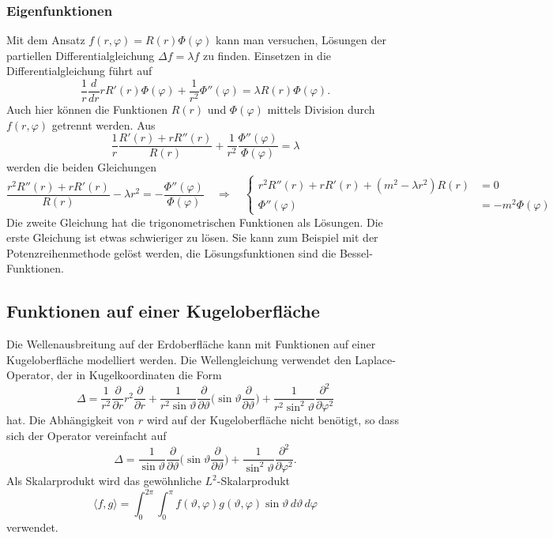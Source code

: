 \subsubsection{Eigenfunktionen}
Mit dem Ansatz $f(r,\varphi) = R(r) \Phi(\varphi)$ kann man versuchen,
Lösungen der partiellen Differentialgleichung $\Delta f=\lambda f$
zu finden.
Einsetzen in die Differentialgleichung führt auf
\[
\frac1r \frac{d}{dr} rR'(r) \Phi(\varphi)
+
\frac1{r^2} \Phi''(\varphi)
=
\lambda R(r)\Phi(\varphi).
\]
Auch hier können die Funktionen $R(r)$ und $\Phi(\varphi)$ mittels
Division durch $f(r,\varphi)$ getrennt werden.
Aus
\[
\frac1r \frac{R'(r) + rR''(r)}{R(r)}
+
\frac{1}{r^2}\frac{\Phi''(\varphi)}{\Phi(\varphi)}
=
\lambda
\]
werden die beiden Gleichungen
\[
\frac{r^2R''(r) + rR'(r)}{R(r)}
-
\lambda r^2
=
-\frac{\Phi''(\varphi)}{\Phi(\varphi)}
\quad\Rightarrow\quad
\left\{
\begin{aligned}
r^2R''(r) + rR'(r) +(m^2 - \lambda r^2)R(r) &= 0
\\
\Phi''(\varphi)&=-m^2 \Phi(\varphi)
\end{aligned}
\right.
\]
Die zweite Gleichung hat die trigonometrischen Funktionen
als Lösungen.
Die erste Gleichung ist etwas schwieriger zu lösen.
Sie kann zum Beispiel mit der Potenzreihenmethode gelöst werden, die
Lösungsfunktionen sind die Bessel-Funktionen.

%
%
\subsection{Funktionen auf einer Kugeloberfläche}
Die Wellenausbreitung auf der Erdoberfläche kann mit Funktionen
auf einer Kugeloberfläche modelliert werden.
Die Wellengleichung verwendet den Laplace-Operator, der in Kugelkoordinaten
die Form
\[
\Delta
=
\frac{1}{r^2}
\frac{\partial}{\partial r}
r^2
\frac{\partial}{\partial r}
+
\frac{1}{r^2\sin\vartheta}
\frac{\partial}{\partial\vartheta}
\biggl(\sin\vartheta\frac{\partial}{\partial\vartheta}\biggr)
+
\frac{1}{r^2\sin^2\vartheta}
\frac{\partial^2}{\partial\varphi^2}
\]
hat.
Die Abhängigkeit von $r$ wird auf der Kugeloberfläche nicht benötigt,
so dass sich der Operator vereinfacht auf
\[
\Delta
=
\frac{1}{\sin\vartheta}
\frac{\partial}{\partial\vartheta}
\biggl(\sin\vartheta\frac{\partial}{\partial\vartheta}\biggr)
+
\frac{1}{\sin^2\vartheta}
\frac{\partial^2}{\partial\varphi^2}.
\]
Als Skalarprodukt wird das gewöhnliche $L^2$-Skalarprodukt
\[
\langle f,g\rangle
=
\int_{0}^{2\pi}
\int_0^\pi
f(\vartheta,\varphi)
g(\vartheta,\varphi)
\sin \vartheta
\,d\vartheta
\,d\varphi
\]
verwendet.

